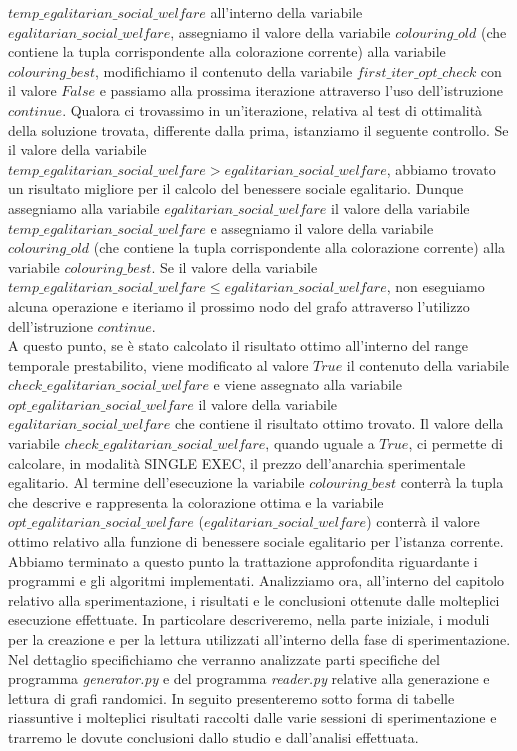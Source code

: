 $temp\_egalitarian\_social\_welfare$ all'interno della variabile \\
$egalitarian\_social\_welfare$, assegniamo il valore della variabile $colouring\_old$ (che contiene la tupla corrispondente alla colorazione corrente) alla variabile $colouring\_best$, modifichiamo il contenuto della variabile $first\_iter\_opt\_check$ con il valore $False$ e passiamo alla prossima iterazione attraverso l'uso dell'istruzione $continue$. Qualora ci trovassimo in un'iterazione, relativa al test di ottimalità della soluzione trovata, differente dalla prima, istanziamo il seguente controllo. Se il valore della variabile \\
$temp\_egalitarian\_social\_welfare > egalitarian\_social\_welfare$, abbiamo trovato un risultato migliore per il calcolo del benessere sociale egalitario. Dunque assegniamo alla variabile $egalitarian\_social\_welfare$ il valore della variabile $temp\_egalitarian\_social\_welfare$ e assegniamo il valore della variabile $colouring\_old$ (che contiene la tupla corrispondente alla colorazione corrente) alla variabile $colouring\_best$. Se il valore della variabile \\
$temp\_egalitarian\_social\_welfare \leq egalitarian\_social\_welfare$, non eseguiamo alcuna operazione e iteriamo il prossimo nodo del grafo attraverso l'utilizzo dell'istruzione $continue$.\\
A questo punto, se è stato calcolato il risultato ottimo all'interno del range temporale prestabilito, viene modificato al valore $True$ il contenuto della variabile $check\_egalitarian\_social\_welfare$ e viene assegnato alla variabile $opt\_egalitarian\_social\_welfare$ il valore della variabile \\
$egalitarian\_social\_welfare$ che contiene il risultato ottimo trovato. Il valore della variabile $check\_egalitarian\_social\_welfare$, quando uguale a $True$, ci permette di calcolare, in modalità SINGLE EXEC, il prezzo dell'anarchia sperimentale egalitario. Al termine dell'esecuzione la variabile $colouring\_best$ conterrà la tupla che descrive e rappresenta la colorazione ottima e la variabile \\
$opt\_egalitarian\_social\_welfare$ ($egalitarian\_social\_welfare$) conterrà il valore ottimo relativo alla funzione di benessere sociale egalitario per l'istanza corrente.\\

Abbiamo terminato a questo punto la trattazione approfondita riguardante i programmi e gli algoritmi implementati. Analizziamo ora, all'interno del capitolo relativo alla sperimentazione, i risultati e le conclusioni ottenute dalle molteplici esecuzione effettuate. In particolare descriveremo, nella parte iniziale, i moduli per la creazione e per la lettura utilizzati all'interno della fase di sperimentazione. Nel dettaglio specifichiamo che verranno analizzate parti specifiche del programma \textit{generator.py} e del programma \textit{reader.py} relative alla generazione e lettura di grafi randomici. In seguito presenteremo sotto forma di tabelle riassuntive i molteplici risultati raccolti dalle varie sessioni di sperimentazione e trarremo le dovute conclusioni dallo studio e dall'analisi effettuata.